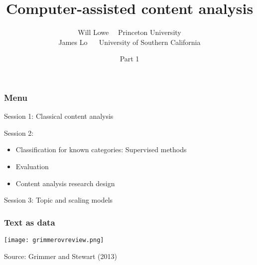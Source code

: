 \documentclass[11pt,compress,professionalfonts]{beamer}
\title{Computer-assisted content analysis}
\author{Will Lowe ~~Princeton University\\James Lo ~~ University of Southern California}
\date{Part 1}
\newcommand{\ita}{\begin{itemize}}
\newcommand{\itz}{\end{itemize}}
\begin{document}
\maketitle


\begin{frame}[t]\frametitle{Menu}

Session 1: Classical content analysis

Session 2:
\ita
\item Classification for known categories: Supervised methods
\item Evaluation
\item Content analysis research design
\itz

Session 3: Topic and scaling models


\end{frame}
\begin{frame}[c]\frametitle{Text as data}

\centerline{\texttt{[image: grimmerovreview.png]}}
\centerline{\footnotesize Source: Grimmer and Stewart (2013)}

\end{frame}
\end{document}
